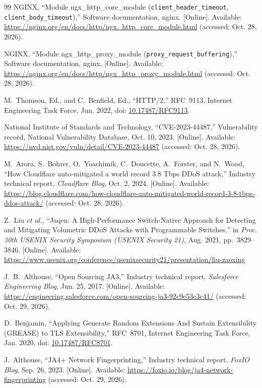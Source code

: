 \documentclass[a4paper,12pt]{article}
\begin{document}
\begin{thebibliography}{99}
NGINX, ``Module ngx\_http\_core\_module (\texttt{client\_header\_timeout}, \texttt{client\_body\_timeout}),'' Software documentation, nginx. [Online]. Available: \url{https://nginx.org/en/docs/http/ngx_http_core_module.html} (accessed: Oct. 28, 2026).

NGINX, ``Module ngx\_http\_proxy\_module (\texttt{proxy\_request\_buffering}),'' Software documentation, nginx. [Online]. Available: \url{https://nginx.org/en/docs/http/ngx_http_proxy_module.html} (accessed: Oct. 28, 2026).

M.~Thomson, Ed., and C.~Benfield, Ed., ``HTTP/2,'' RFC~9113, Internet Engineering Task Force, Jun. 2022, doi: \href{https://doi.org/10.17487/RFC9113}{10.17487/RFC9113}.

National Institute of Standards and Technology, ``CVE-2023-44487,'' Vulnerability record, National Vulnerability Database, Oct. 10, 2023. [Online]. Available: \url{https://nvd.nist.gov/vuln/detail/CVE-2023-44487} (accessed: Oct. 28, 2026).

M.~Arora, S.~Bohrer, O.~Yoachimik, C.~Doucette, A.~Forster, and N.~Wood, ``How Cloudflare auto-mitigated a world record 3.8 Tbps DDoS attack,'' Industry technical report, \textit{Cloudflare Blog}, Oct. 2, 2024. [Online]. Available: \url{https://blog.cloudflare.com/how-cloudflare-auto-mitigated-world-record-3-8-tbps-ddos-attack/} (accessed: Oct. 28, 2026).

Z.~Liu \textit{et al.}, ``Jaqen: A High-Performance Switch-Native Approach for Detecting and Mitigating Volumetric DDoS Attacks with Programmable Switches,'' in \textit{Proc. 30th USENIX Security Symposium (USENIX Security 21)}, Aug. 2021, pp.~3829--3846. [Online]. Available: \url{https://www.usenix.org/conference/usenixsecurity21/presentation/liu-zaoxing}

J.~B.~Althouse, ``Open Sourcing JA3,'' Industry technical report, \textit{Salesforce Engineering Blog}, Jun. 25, 2017. [Online]. Available: \url{https://engineering.salesforce.com/open-sourcing-ja3-92c9e53c3c41/} (accessed: Oct. 29, 2026).

D.~Benjamin, ``Applying Generate Random Extensions And Sustain Extensibility (GREASE) to TLS Extensibility,'' RFC~8701, Internet Engineering Task Force, Jan. 2020, doi: \href{https://doi.org/10.17487/RFC8701}{10.17487/RFC8701}.

J.~Althouse, ``JA4+ Network Fingerprinting,'' Industry technical report, \textit{FoxIO Blog}, Sep. 26, 2023. [Online]. Available: \url{https://foxio.io/blog/ja4-network-fingerprinting} (accessed: Oct. 29, 2026).


\end{thebibliography}
\end{document}
